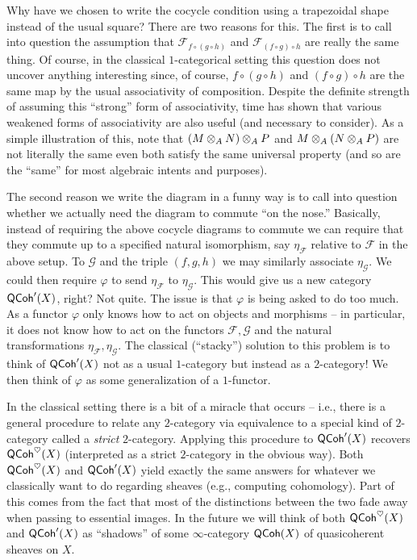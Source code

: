\documentclass[11pt]{article}
\newcommand{\FF}{\mathcal{F}}
\newcommand{\GG}{\mathcal{G}}
\renewcommand{\phi}{\varphi}
\begin{document}
Why have we chosen to write the cocycle condition using a trapezoidal shape instead of the usual square? There are two reasons for this. The first is to call into question the assumption that $\FF_{f\circ(g\circ h)}$ and $\FF_{(f\circ g)\circ h}$ are really the same thing. Of course, in the classical $1$-categorical setting this question does not uncover anything interesting since, of course, $f\circ(g\circ h)$ and $(f\circ g)\circ h$ are the same map by the usual associativity of composition. Despite the definite strength of assuming this ``strong'' form of associativity, time has shown that various weakened forms of associativity are also useful (and necessary to consider). As a simple illustration of this, note that $(M\otimes_AN)\otimes_AP$ and $M\otimes_A(N\otimes_AP)$ are not literally the same even both satisfy the same universal property (and so are the ``same'' for most algebraic intents and purposes).

The second reason we write the diagram in a funny way is to call into question whether we actually need the diagram to commute ``on the nose.'' Basically, instead of requiring the above cocycle diagrams to commute we can require that they commute up to a specified natural isomorphism, say $\eta_{\FF}$ relative to $\FF$ in the above setup. To $\GG$ and the triple $(f,g,h)$ we may similarly associate $\eta_{\GG}$. We could then require $\phi$ to send $\eta_{\FF}$ to $\eta_{\GG}$. This would give us a new category $\operatorname{\mathsf{QCoh}}'(X)$, right? Not quite. The issue is that $\phi$ is being asked to do too much. As a functor $\phi$ only knows how to act on objects and morphisms -- in particular, it does not know how to act on the functors $\FF,\GG$ and the natural transformations $\eta_{\FF},\eta_{\GG}$. The classical (``stacky'') solution to this problem is to think of $\operatorname{\mathsf{QCoh}}'(X)$ not as a usual $1$-category but instead as a $2$-category! We then think of $\phi$ as some generalization of a $1$-functor.

In the classical setting there is a bit of a miracle that occurs -- i.e., there is a general procedure to relate any $2$-category via equivalence to a special kind of $2$-category called a \emph{strict} $2$-category. Applying this procedure to $\operatorname{\mathsf{QCoh}}'(X)$ recovers $\operatorname{\mathsf{QCoh}}^{\heartsuit}(X)$ (interpreted as a strict $2$-category in the obvious way). Both $\operatorname{\mathsf{QCoh}}^{\heartsuit}(X)$ and $\operatorname{\mathsf{QCoh}}'(X)$ yield exactly the same answers for whatever we classically want to do regarding sheaves (e.g., computing cohomology). Part of this comes from the fact that most of the distinctions between the two fade away when passing to essential images. In the future we will think of both $\operatorname{\mathsf{QCoh}}^{\heartsuit}(X)$ and $\operatorname{\mathsf{QCoh}}'(X)$ as ``shadows'' of some $\infty$-category $\operatorname{\mathsf{QCoh}}(X)$ of quasicoherent sheaves on $X$.
\end{document}
